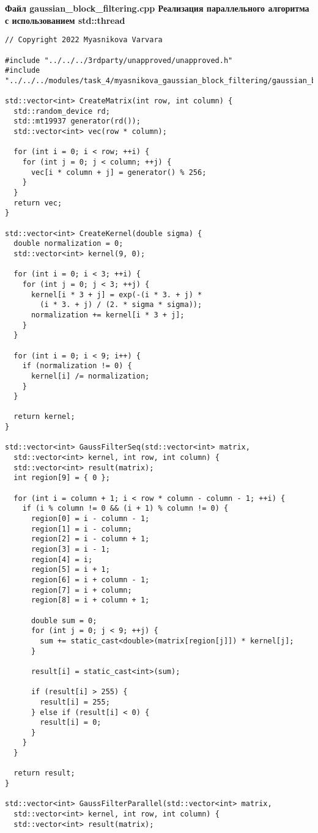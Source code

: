\documentclass{report}
\begin{document}
\newpage
\textbf{ Файл gaussian\_block\_filtering.cpp Реализация параллельного алгоритма с использованием std::thread}
\begin{lstlisting}
// Copyright 2022 Myasnikova Varvara

#include "../../../3rdparty/unapproved/unapproved.h"
#include "../../../modules/task_4/myasnikova_gaussian_block_filtering/gaussian_block_filtering.h"

std::vector<int> CreateMatrix(int row, int column) {
  std::random_device rd;
  std::mt19937 generator(rd());
  std::vector<int> vec(row * column);

  for (int i = 0; i < row; ++i) {
    for (int j = 0; j < column; ++j) {
      vec[i * column + j] = generator() % 256;
    }
  }
  return vec;
}

std::vector<int> CreateKernel(double sigma) {
  double normalization = 0;
  std::vector<int> kernel(9, 0);

  for (int i = 0; i < 3; ++i) {
    for (int j = 0; j < 3; ++j) {
      kernel[i * 3 + j] = exp(-(i * 3. + j) *
        (i * 3. + j) / (2. * sigma * sigma));
      normalization += kernel[i * 3 + j];
    }
  }

  for (int i = 0; i < 9; i++) {
    if (normalization != 0) {
      kernel[i] /= normalization;
    }
  }

  return kernel;
}

std::vector<int> GaussFilterSeq(std::vector<int> matrix,
  std::vector<int> kernel, int row, int column) {
  std::vector<int> result(matrix);
  int region[9] = { 0 };

  for (int i = column + 1; i < row * column - column - 1; ++i) {
    if (i % column != 0 && (i + 1) % column != 0) {
      region[0] = i - column - 1;
      region[1] = i - column;
      region[2] = i - column + 1;
      region[3] = i - 1;
      region[4] = i;
      region[5] = i + 1;
      region[6] = i + column - 1;
      region[7] = i + column;
      region[8] = i + column + 1;

      double sum = 0;
      for (int j = 0; j < 9; ++j) {
        sum += static_cast<double>(matrix[region[j]]) * kernel[j];
      }

      result[i] = static_cast<int>(sum);

      if (result[i] > 255) {
        result[i] = 255;
      } else if (result[i] < 0) {
        result[i] = 0;
      }
    }
  }

  return result;
}

std::vector<int> GaussFilterParallel(std::vector<int> matrix,
  std::vector<int> kernel, int row, int column) {
  std::vector<int> result(matrix);


\end{lstlisting}
\end{document}
